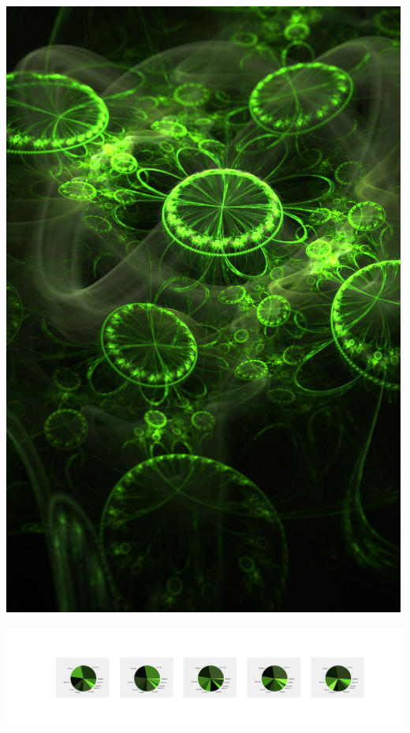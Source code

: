 \documentclass[11pt]{article}
\begin{document}
\begin{landscape}
    \begin{center}
    \includegraphics[width=\textwidth]{./nbimg/file (20).jpg}
    \end{center}

    \begin{center}
    \includegraphics[width=250mm]{./nbimg/pie-112.jpg}
    \end{center}


\end{landscape}
\end{document}
